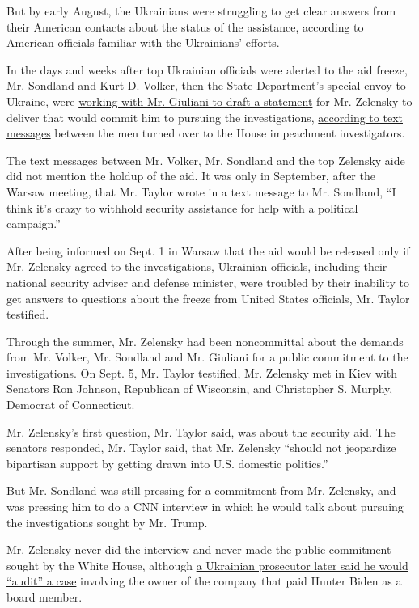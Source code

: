 But by early August, the Ukrainians were struggling to get clear answers
from their American contacts about the status of the assistance,
according to American officials familiar with the Ukrainians' efforts.

In the days and weeks after top Ukrainian officials were alerted to the
aid freeze, Mr. Sondland and Kurt D. Volker, then the State Department's
special envoy to Ukraine, were
\href{https://www.nytimes.com/2019/10/03/us/politics/trump-ukraine.html}{working
with Mr. Giuliani to draft a statement} for Mr. Zelensky to deliver that
would commit him to pursuing the investigations,
\href{https://www.nytimes.com/interactive/2019/10/04/us/politics/ukraine-text-messages-volker.html}{according
to text messages} between the men turned over to the House impeachment
investigators.

The text messages between Mr. Volker, Mr. Sondland and the top Zelensky
aide did not mention the holdup of the aid. It was only in September,
after the Warsaw meeting, that Mr. Taylor wrote in a text message to Mr.
Sondland, ``I think it's crazy to withhold security assistance for help
with a political campaign.''

After being informed on Sept. 1 in Warsaw that the aid would be released
only if Mr. Zelensky agreed to the investigations, Ukrainian officials,
including their national security adviser and defense minister, were
troubled by their inability to get answers to questions about the freeze
from United States officials, Mr. Taylor testified.

Through the summer, Mr. Zelensky had been noncommittal about the demands
from Mr. Volker, Mr. Sondland and Mr. Giuliani for a public commitment
to the investigations. On Sept. 5, Mr. Taylor testified, Mr. Zelensky
met in Kiev with Senators Ron Johnson, Republican of Wisconsin, and
Christopher S. Murphy, Democrat of Connecticut.

Mr. Zelensky's first question, Mr. Taylor said, was about the security
aid. The senators responded, Mr. Taylor said, that Mr. Zelensky ``should
not jeopardize bipartisan support by getting drawn into U.S. domestic
politics.''

But Mr. Sondland was still pressing for a commitment from Mr. Zelensky,
and was pressing him to do a CNN interview in which he would talk about
pursuing the investigations sought by Mr. Trump.

Mr. Zelensky never did the interview and never made the public
commitment sought by the White House, although
\href{https://www.nytimes.com/2019/10/04/world/europe/ukraine-biden-burisma.html}{a
Ukrainian prosecutor later said he would ``audit'' a case} involving the
owner of the company that paid Hunter Biden as a board member.

